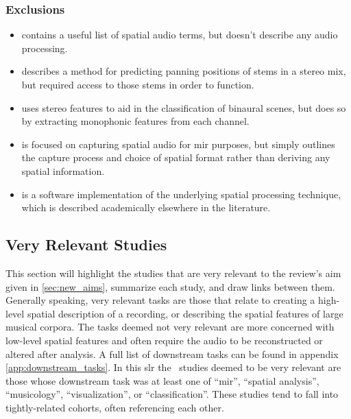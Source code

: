 \documentclass[referee,pdflatex,sn-mathphys-num]{sn-jnl}%
\newcommand{\q}[1]{\enquote{#1}}
\begin{document}
\subsubsection*{Exclusions}
\begin{itemize}
    \item \cite{lindauSpatialAudioQuality2014} contains a useful list of spatial audio terms, but doesn't describe any audio processing.
    \item \cite{coloneReverseEngineeringNonlinear2023} describes a method for predicting panning positions of stems in a stereo mix, but required access to those stems in order to function.
    \item \cite{felipeAcousticSceneClassification2017} uses stereo features to aid in the classification of binaural scenes, but does so by extracting monophonic features from each channel.
    \item \cite{sierraMultimodalMethodologyMusic2023} is focused on capturing spatial audio for \gls{mir} purposes, but simply outlines the capture process and choice of spatial format rather than deriving any spatial information.
    \item \cite{pulkkiFirstOrderDirectionalAudio2017} is a software implementation of the underlying spatial processing technique, which is described academically elsewhere in the literature.
\end{itemize}


\subsection{Very Relevant Studies}
\label{sec:very_relevant_studies}

This section will highlight the studies that are very relevant to the review's aim given in \cref{sec:new_aims}, summarize each study, and draw links between them. Generally speaking, very relevant tasks are those that relate to creating a high-level spatial description of a recording, or describing the spatial features of large musical corpora. The tasks deemed not very relevant are more concerned with low-level spatial features and often require the audio to be reconstructed or altered after analysis. A full list of downstream tasks can be found in appendix \ref{app:downstream_tasks}. In this \gls{slr} the \nStudiesIncludedVeryRelevant~studies deemed to be very relevant are those whose downstream task was at least one of \q{\gls{mir}}, \q{spatial analysis}, \q{musicology}, \q{visualization}, or \q{classification}. These studies tend to fall into tightly-related cohorts, often referencing each other.
\end{document}
